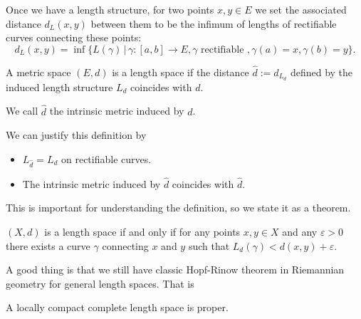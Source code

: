 Once we have a length structure,
for two points \( x , y \in E \) we set the associated distance \( d_L ( x , y ) \) between them to be the infimum of lengths of rectifiable curves connecting these points:
\[
	d _ { L } ( x , y ) = \inf \{ L ( \gamma ) \,|\, \gamma: [ a , b ] \rightarrow E , \gamma \text{ rectifiable }, \gamma ( a ) = x , \gamma ( b ) = y \}.
\]

\begin{defn}
	\label{defn:length_spaces}
	A metric space $(E,d)$ is a length space if the distance $\hat{d} := d_{L_{d}}$ defined by
	the induced length structure $L_d$ coincides with $d$.

	We call $\hat{d}$ the intrinsic metric induced by $d$.
\end{defn}

We can justify this definition by \cite[Proposition 2.3.12]{burago2001course}
\begin{itemize}
	\item $L_{\hat{d}} = L_{d}$ on rectifiable curves.
	\item The intrinsic metric induced by \( \hat { d } \) coincides with \( \hat { d }\).
\end{itemize}
This is important for understanding the definition,
so we state it as a theorem.

\begin{thm}
	\( ( X , d ) \) is a length space if and only if for any points
	\( x , y \in X \) and any \( \varepsilon > 0 \) there exists a curve \( \gamma \) connecting \( x \) and \( y \) such
	that \( L _ { d } ( \gamma ) < d ( x , y ) + \varepsilon \).
\end{thm}

A good thing is that we still have classic Hopf-Rinow theorem
in Riemannian geometry for general length spaces.
That is
\begin{prop}
	A locally compact complete length space is proper.
\end{prop}
